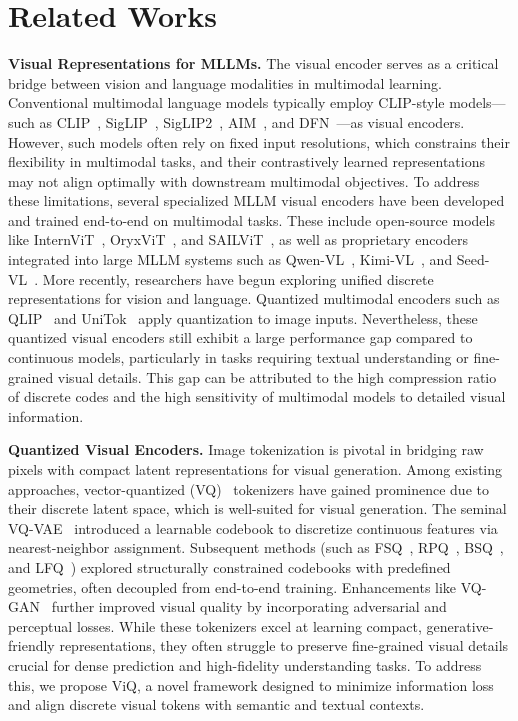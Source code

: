 \documentclass{llmxive}
\providecommand{\paragrapha}[1]{\par\addvspace{0.45em}\noindent\textbf{#1}}
\begin{document}
\section{Related Works}
\label{sec:related_works}

\paragrapha{Visual Representations for MLLMs. }The visual encoder serves as a critical bridge between vision and language modalities in multimodal learning. Conventional multimodal language models typically employ CLIP-style models—such as CLIP~\cite{radford2021clip}, SigLIP~\cite{zhai2023siglip}, SigLIP2~\cite{tschannen2025siglip}, AIM~\cite{fini2025multimodal}, and DFN~\cite{fang2023dfn}—as visual encoders. However, such models often rely on fixed input resolutions, which constrains their flexibility in multimodal tasks, and their contrastively learned representations may not align optimally with downstream multimodal objectives. To address these limitations, several specialized MLLM visual encoders have been developed and trained end-to-end on multimodal tasks. These include open-source models like InternViT~\cite{chen2024internvl,zhu2025internvl3}, OryxViT~\cite{liu2024oryx}, and SAILViT~\cite{yin2025sail}, as well as proprietary encoders integrated into large MLLM systems such as Qwen-VL~\cite{Qwen2.5-VL}, Kimi-VL~\cite{team2025kimi}, and Seed-VL~\cite{guo2025seed1}. More recently, researchers have begun exploring unified discrete representations for vision and language. Quantized multimodal encoders such as QLIP~\cite{zhao2025qlip} and UniTok~\cite{ma2025unitok} apply quantization to image inputs. Nevertheless, these quantized visual encoders still exhibit a large performance gap compared to continuous models, particularly in tasks requiring textual understanding or fine-grained visual details. This gap can be attributed to the high compression ratio of discrete codes and the high sensitivity of multimodal models to detailed visual information.

\paragrapha{Quantized Visual Encoders. } Image tokenization is pivotal in bridging raw pixels with compact latent representations for visual generation. Among existing approaches, vector-quantized (VQ)~\cite{gersho2012vector} tokenizers have gained prominence due to their discrete latent space, which is well-suited for visual generation. The seminal VQ-VAE~\cite{van2017neural} introduced a learnable codebook to discretize continuous features via nearest-neighbor assignment. Subsequent methods (such as FSQ~\cite{mentzerfinite}, RPQ~\cite{chiu2022self}, BSQ~\cite{zhaoimage}, and LFQ~\cite{yulanguage}) explored structurally constrained codebooks with predefined geometries, often decoupled from end-to-end training. Enhancements like VQ-GAN~\cite{esser2021taming} further improved visual quality by incorporating adversarial and perceptual losses. While these tokenizers excel at learning compact, generative-friendly representations, they often struggle to preserve fine-grained visual details crucial for dense prediction and high-fidelity understanding tasks. To address this, we propose ViQ, a novel framework designed to minimize information loss and align discrete visual tokens with semantic and textual contexts.
\end{document}
